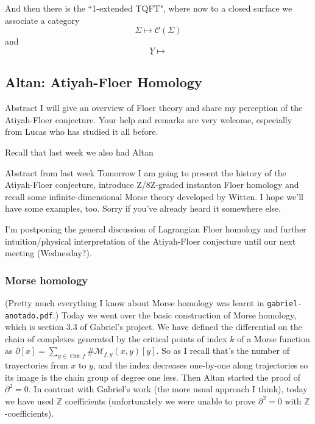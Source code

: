 And then there is the ``1-extended TQFT", where now to a closed surface we
associate a category
\[\Sigma \mapsto  \mathcal{C}(\Sigma)\]
and
\[\underline{Y} \mapsto \]

\subsection{Altan: Atiyah-Floer Homology}

\begin{thing4}{Abstract}
I will give an overview of Floer theory and share my perception of the
Atiyah-Floer conjecture. Your help and remarks are very welcome, especially from
Lucas who has studied it all before.
\end{thing4}

Recall that last week we also had Altan

\begin{thing4}{Abstract from last week}
Tomorrow I am going to present the history of the Atiyah-Floer conjecture,
introduce Z/8Z-graded instanton Floer homology and recall some
infinite-dimensional Morse theory developed by Witten. I hope we'll have some
examples, too. Sorry if you've already heard it somewhere else.

I'm postponing the general discussion of Lagrangian Floer homology and further
intuition/physical interpretation of the Atiyah-Floer conjecture until our next
meeting (Wednesday?).
\end{thing4}

\subsubsection{Morse homology}

\begin{remark}\leavevmode
 (Pretty much everything I know about Morse homology was learnt in
 \texttt{gabriel-anotado.pdf}.) Today we went over the basic construction of
 Morse homology, which is section 3.3 of Gabriel's project. We have defined the
 differential on the chain of complexes generated by the critical points of
 index \(k\) of a Morse function as \(\partial[x]=\sum_{y \in
 \operatorname{Crit}f}\# \mathcal{M}_{f,y}(x,y)[y]\). So as I recall that's the
 number of trayectories from \(x\) to \(y\), and the index decreases one-by-one
 along trajectories so its image is the chain group of degree one less. Then
 Altan started the proof of \(\partial^2=0\). In contrast with Gabriel's work
 (the more usual approach I think), today we have used \(\mathbb{Z}\)
 coefficients (unfortunately we were unable to prove \(\partial^2=0\) with
 \(\mathbb{Z}\)-coefficients).
\end{remark}

